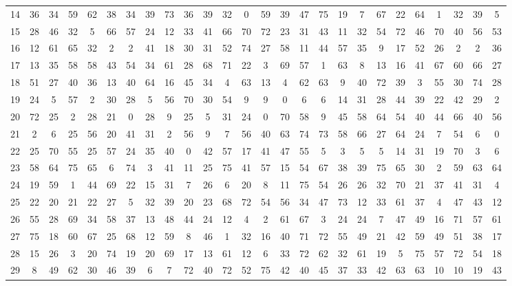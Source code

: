 \begin{table}
\begin{tabular}{c c c c c c c c c c c c c c c c c c c c c c c c c c }
14 & 36 & 34 & 59 & 62 & 38 & 34 & 39 & 73 & 36 & 39 & 32 & 0 & 59 & 39 & 47 & 75 & 19 & 7 & 67 & 22 & 64 & 1 & 32 & 39 & 5 \\
15 & 28 & 46 & 32 & 5 & 66 & 57 & 24 & 12 & 33 & 41 & 66 & 70 & 72 & 23 & 31 & 43 & 11 & 32 & 54 & 72 & 46 & 70 & 40 & 56 & 53 \\
16 & 12 & 61 & 65 & 32 & 2 & 2 & 41 & 18 & 30 & 31 & 52 & 74 & 27 & 58 & 11 & 44 & 57 & 35 & 9 & 17 & 52 & 26 & 2 & 2 & 36 \\
17 & 13 & 35 & 58 & 58 & 43 & 54 & 34 & 61 & 28 & 68 & 71 & 22 & 3 & 69 & 57 & 1 & 63 & 8 & 13 & 16 & 41 & 67 & 60 & 66 & 27 \\
18 & 51 & 27 & 40 & 36 & 13 & 40 & 64 & 16 & 45 & 34 & 4 & 63 & 13 & 4 & 62 & 63 & 9 & 40 & 72 & 39 & 3 & 55 & 30 & 74 & 28 \\
19 & 24 & 5 & 57 & 2 & 30 & 28 & 5 & 56 & 70 & 30 & 54 & 9 & 9 & 0 & 6 & 6 & 14 & 31 & 28 & 44 & 39 & 22 & 42 & 29 & 2 \\
20 & 72 & 25 & 2 & 28 & 21 & 0 & 28 & 9 & 25 & 5 & 31 & 24 & 0 & 70 & 58 & 9 & 45 & 58 & 64 & 54 & 40 & 44 & 66 & 40 & 56 \\
21 & 2 & 6 & 25 & 56 & 20 & 41 & 31 & 2 & 56 & 9 & 7 & 56 & 40 & 63 & 74 & 73 & 58 & 66 & 27 & 64 & 24 & 7 & 54 & 6 & 0 \\
22 & 25 & 70 & 55 & 25 & 57 & 24 & 35 & 40 & 0 & 42 & 57 & 17 & 41 & 47 & 55 & 5 & 3 & 5 & 5 & 14 & 31 & 19 & 70 & 3 & 6 \\
23 & 58 & 64 & 75 & 65 & 6 & 74 & 3 & 41 & 11 & 25 & 75 & 41 & 57 & 15 & 54 & 67 & 38 & 39 & 75 & 65 & 30 & 2 & 59 & 63 & 64 \\
24 & 19 & 59 & 1 & 44 & 69 & 22 & 15 & 31 & 7 & 26 & 6 & 20 & 8 & 11 & 75 & 54 & 26 & 26 & 32 & 70 & 21 & 37 & 41 & 31 & 4 \\
25 & 22 & 20 & 21 & 22 & 27 & 5 & 32 & 39 & 20 & 23 & 68 & 72 & 54 & 56 & 34 & 47 & 73 & 12 & 33 & 61 & 37 & 4 & 47 & 43 & 12 \\
26 & 55 & 28 & 69 & 34 & 58 & 37 & 13 & 48 & 44 & 24 & 12 & 4 & 2 & 61 & 67 & 3 & 24 & 24 & 7 & 47 & 49 & 16 & 71 & 57 & 61 \\
27 & 75 & 18 & 60 & 67 & 25 & 68 & 12 & 59 & 8 & 46 & 1 & 32 & 16 & 40 & 71 & 72 & 55 & 49 & 21 & 42 & 59 & 49 & 51 & 38 & 17 \\
28 & 15 & 26 & 3 & 20 & 74 & 19 & 20 & 69 & 17 & 13 & 61 & 12 & 6 & 33 & 72 & 62 & 32 & 61 & 19 & 5 & 75 & 57 & 72 & 54 & 18 \\
29 & 8 & 49 & 62 & 30 & 46 & 39 & 6 & 7 & 72 & 40 & 72 & 52 & 75 & 42 & 40 & 45 & 37 & 33 & 42 & 63 & 63 & 10 & 10 & 19 & 43 \\

\end{tabular}
\end{table}
